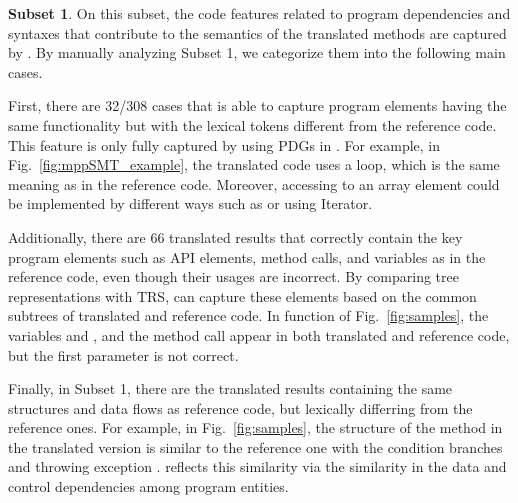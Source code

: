

\textbf{Subset 1}. On this subset, the code features related to
program dependencies and syntaxes that contribute to the semantics of
the translated methods are captured by {\model}. By manually analyzing
Subset 1, we categorize them into the following main cases.

First, there are 32/308 cases that {\model} is able to capture program
elements having the same functionality but with the lexical tokens
different from the reference code. This feature is only fully captured
by using PDGs in {\model}. For example, in
Fig.~\ref{fig:mppSMT_example}, the translated code uses a 
loop, which is the same meaning as  in the reference
code. Moreover, accessing to an array element could be implemented by
different ways such as  or using Iterator.
%

Additionally, there are 66 translated results that correctly contain
the key program elements such as API elements, method calls, and
variables as in the reference code, even though their usages are
incorrect. By comparing tree representations with TRS, {\model} can
capture these elements based on the common subtrees of translated and
reference code. In function  of
Fig.~\ref{fig:samples}, the variables  and
, and the method call  appear in
both translated and reference code, but the first parameter is not correct.
%

Finally, in Subset 1, there are the translated results containing the
same structures and data flows as reference code, but lexically
differring from the reference ones. For example, in
Fig.~\ref{fig:samples}, the structure of the method
 in the translated version is similar to the
reference one with the condition branches  and throwing
exception . {\model} reflects this
similarity via the similarity in the data and control dependencies
among program entities.



